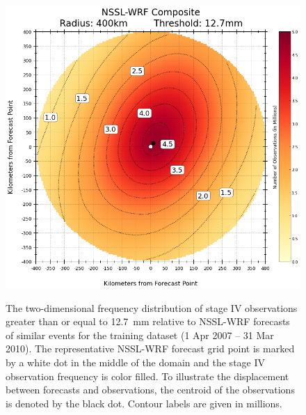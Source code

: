 \newpage
\begin{figure}[cc]
    \centering
    \includegraphics[width=35pc, angle=0]{./deterministic/figs/single_member_composite_400km_12-7mm.png}\\
    \caption{The two-dimensional frequency distribution of stage IV observations greater than or equal to \mbox{12.7 mm} relative to NSSL-WRF forecasts of similar events for the training dataset (1 Apr 2007 -- 31 Mar 2010). The representative NSSL-WRF forecast grid point is marked by a white dot in the middle of the domain and the stage IV observation frequency is color filled. To illustrate the displacement between forecasts and observations, the centroid of the observations is denoted by the black dot. Contour labels are given in millions.}
    \label{single_12thresh}
\end{figure}


